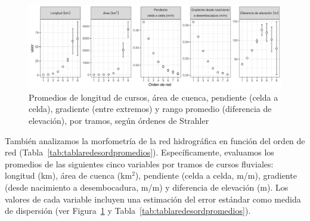 \documentclass[spanish]{article}
\begin{document}
\begin{figure}

{\centering \includegraphics[width=1\linewidth]{figuras/variables-de-redes-segun-ordenes} 

}

\caption{Promedios de longitud de cursos, área de cuenca, pendiente (celda a celda), gradiente (entre extremos) y rango promedio (diferencia de elevación), por tramos, según órdenes de Strahler}\label{fig:variablesredesordenes}
\end{figure}

También analizamos la morfometría de la red hidrográfica en función del
orden de red (Tabla~\ref{tab:tablaredesordpromedios}). Específicamente,
evaluamos los promedios de las siguientes cinco variables por tramos de
cursos fluviales: longitud (km), área de cuenca (km\(^2\)), pendiente
(celda a celda, m/m), gradiente (desde nacimiento a desembocadura, m/m)
y diferencia de elevación (m). Los valores de cada variable incluyen una
estimación del error estándar como medida de dispersión (ver
Figura~\ref{fig:variablesredesordenes} y
Tabla~\ref{tab:tablaredesordpromedios}).
\end{document}
